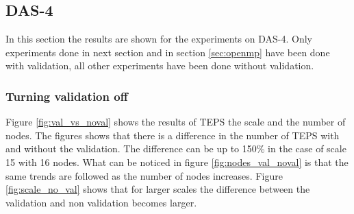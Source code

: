\subsection{DAS-4}
In this section the results are shown for the experiments on DAS-4. Only experiments done in next section and in section \ref{sec:openmp} have been done with validation, all other experiments have been done without validation.

\subsubsection{Turning validation off}
\label{sec:noval}
 Figure \ref{fig:val_vs_noval} shows the results of TEPS the scale and the number of nodes. The figures shows that there is a difference in the number of TEPS with and without the validation. The difference can be up to 150\% in the case of scale 15 with 16 nodes. What can be noticed in figure \ref{fig:nodes_val_noval} is that the same trends are followed as the number of nodes increases.
 Figure \ref{fig:scale_no_val} shows that for larger scales the difference between the validation and non validation becomes larger.

